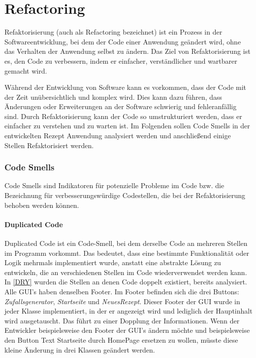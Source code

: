 \chapter{Refactoring}
Refaktorisierung (auch als Refactoring bezeichnet) ist ein Prozess in der Softwareentwicklung, bei dem der Code einer Anwendung geändert wird, ohne das Verhalten der Anwendung selbst zu ändern. Das Ziel von Refaktorisierung ist es, den Code zu verbessern, indem er einfacher, verständlicher und wartbarer gemacht wird.

Während der Entwicklung von Software kann es vorkommen, dass der Code mit der Zeit unübersichtlich und komplex wird. Dies kann dazu führen, dass Änderungen oder Erweiterungen an der Software schwierig und fehleranfällig sind. Durch Refaktorisierung kann der Code so umstrukturiert werden, dass er einfacher zu verstehen und zu warten ist. Im Folgenden sollen Code Smells in der entwickelten Rezept Anwendung analysiert werden und anschließend einige Stellen Refaktorisiert werden. 
\subsection{Code Smells}
Code Smells sind Indikatoren für potenzielle Probleme im Code bzw. die Bezeichnung für verbesserungswürdige Codestellen, die bei der Refaktorisierung behoben werden können. 
\subsubsection{Duplicated Code}
Duplicated Code ist ein Code-Smell, bei dem derselbe Code an mehreren Stellen im Programm vorkommt. Das bedeutet, dass eine bestimmte Funktionalität oder Logik mehrmals implementiert wurde, anstatt eine abstrakte Lösung zu entwickeln, die an verschiedenen Stellen im Code wiederverwendet werden kann. In \autoref{DRY} wurden die Stellen an denen Code doppelt existiert, bereits analysiert. Alle GUI's haben denselben Footer. Im Footer befinden sich die drei Buttons: \emph{Zufallsgenerator}, \emph{Startseite} und \emph{NeuesRezept}. Dieser Footer der GUI wurde in jeder Klasse implementiert, in der er angezeigt wird und lediglich der Hauptinhalt wird ausgetauscht. Das führt zu einer Dopplung der Informationen. Wenn der Entwickler beispielsweise den Footer der GUI's ändern möchte und beispielsweise den Button Text Startseite durch HomePage ersetzen zu wollen, müsste diese kleine Änderung in drei Klassen geändert werden. 

